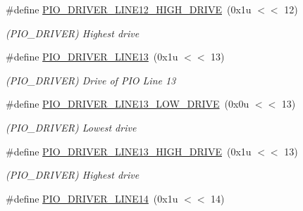 \begin{DoxyCompactItemize}
\mbox{\label{group__SAMS70__PIO_ga60c0f0f249e990701e8e27247ebe8a0c}} 
\#define \mbox{\hyperlink{group__SAMS70__PIO_ga60c0f0f249e990701e8e27247ebe8a0c}{P\+I\+O\+\_\+\+D\+R\+I\+V\+E\+R\+\_\+\+L\+I\+N\+E12\+\_\+\+H\+I\+G\+H\+\_\+\+D\+R\+I\+VE}}~(0x1u $<$$<$ 12)
\begin{DoxyCompactList}\small\item\em (P\+I\+O\+\_\+\+D\+R\+I\+V\+ER) Highest drive \end{DoxyCompactList}\item 
\mbox{\label{group__SAMS70__PIO_gaf97161f3fc0eb7b7a90271c9d85c25ad}} 
\#define \mbox{\hyperlink{group__SAMS70__PIO_gaf97161f3fc0eb7b7a90271c9d85c25ad}{P\+I\+O\+\_\+\+D\+R\+I\+V\+E\+R\+\_\+\+L\+I\+N\+E13}}~(0x1u $<$$<$ 13)
\begin{DoxyCompactList}\small\item\em (P\+I\+O\+\_\+\+D\+R\+I\+V\+ER) Drive of P\+IO Line 13 \end{DoxyCompactList}\item 
\mbox{\label{group__SAMS70__PIO_ga6c7d75cdc8fc502ca1591322df59ee65}} 
\#define \mbox{\hyperlink{group__SAMS70__PIO_ga6c7d75cdc8fc502ca1591322df59ee65}{P\+I\+O\+\_\+\+D\+R\+I\+V\+E\+R\+\_\+\+L\+I\+N\+E13\+\_\+\+L\+O\+W\+\_\+\+D\+R\+I\+VE}}~(0x0u $<$$<$ 13)
\begin{DoxyCompactList}\small\item\em (P\+I\+O\+\_\+\+D\+R\+I\+V\+ER) Lowest drive \end{DoxyCompactList}\item 
\mbox{\label{group__SAMS70__PIO_ga35cfa7a75637d43bd35b6583801bacac}} 
\#define \mbox{\hyperlink{group__SAMS70__PIO_ga35cfa7a75637d43bd35b6583801bacac}{P\+I\+O\+\_\+\+D\+R\+I\+V\+E\+R\+\_\+\+L\+I\+N\+E13\+\_\+\+H\+I\+G\+H\+\_\+\+D\+R\+I\+VE}}~(0x1u $<$$<$ 13)
\begin{DoxyCompactList}\small\item\em (P\+I\+O\+\_\+\+D\+R\+I\+V\+ER) Highest drive \end{DoxyCompactList}\item 
\mbox{\label{group__SAMS70__PIO_ga397e14fa6b7191bd73435f296c3227b8}} 
\#define \mbox{\hyperlink{group__SAMS70__PIO_ga397e14fa6b7191bd73435f296c3227b8}{P\+I\+O\+\_\+\+D\+R\+I\+V\+E\+R\+\_\+\+L\+I\+N\+E14}}~(0x1u $<$$<$ 14)
$$
\end{DoxyCompactItemize}
